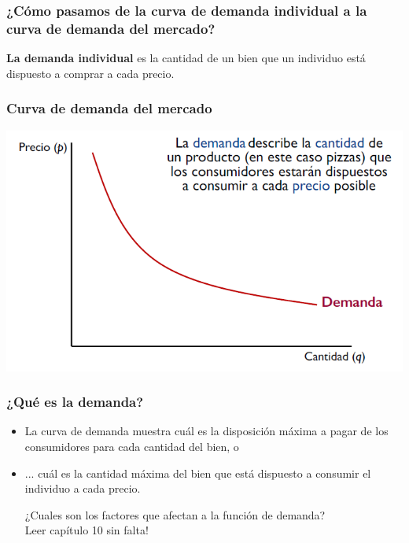 \documentclass{beamer}
\begin{document}
\begin{frame}
\frametitle{¿Cómo pasamos de la curva de demanda individual a la curva de demanda del mercado?}
  \begin{boxA}
    \begin{center}
      \textbf{La demanda individual} es la cantidad de un bien que un individuo está dispuesto a comprar a cada precio.
    \end{center}
  \end{boxA}
\end{frame}

\begin{frame}
\frametitle{Curva de demanda del mercado}
\centering
\includegraphics[scale=0.6]{../Figures/Tema_02.58_demanda.png}
\end{frame}

\begin{frame}
\frametitle{¿Qué es la demanda?}
\begin{itemize}
    \item La curva de demanda muestra cuál es la disposición máxima a pagar de los consumidores para cada cantidad del bien, o \vspace{2mm}
    \item ... cuál es la cantidad máxima del bien que está dispuesto a consumir el individuo a cada precio.
    \begin{boxA}
      \begin{center}
        ¿Cuales son los factores que afectan a la función de demanda? \\
        Leer capítulo 10 sin falta!
      \end{center}
    \end{boxA}
\end{itemize}
\end{frame}
\end{document}
